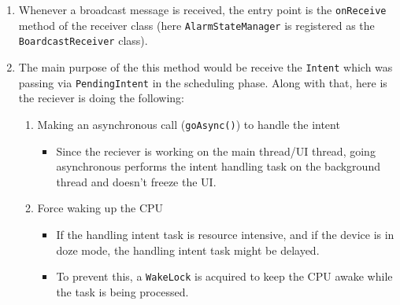 \documentclass{article}
\begin{document}
\begin{enumerate}
    \begin{enumerate}
        \item Whenever a broadcast message is received, the entry point is the \texttt{onReceive} method of the receiver class (here \texttt{AlarmStateManager} is registered as the \texttt{BoardcastReceiver} class). 
        \item The main purpose of the this method would be receive the \texttt{Intent} which was passing via \texttt{PendingIntent} in the scheduling phase. Along with that, here is the reciever is doing the following: 
        \begin{enumerate}
            \item Making an asynchronous call (\texttt{goAsync()}) to handle the intent
            \begin{itemize}
                \item Since the reciever is working on the main thread/UI thread, going asynchronous performs the intent handling task on the background thread and doesn't freeze the UI.
            \end{itemize}
            \item Force waking up the CPU
            \begin{itemize}
                \item If the handling intent task is resource intensive, and if the device is in doze mode, the handling intent task might be delayed. 
                \item To prevent this, a \texttt{WakeLock} is acquired to keep the CPU awake while the task is being processed.
            \end{itemize}
        \end{enumerate}
    \end{enumerate}


\end{enumerate}
\end{document}
